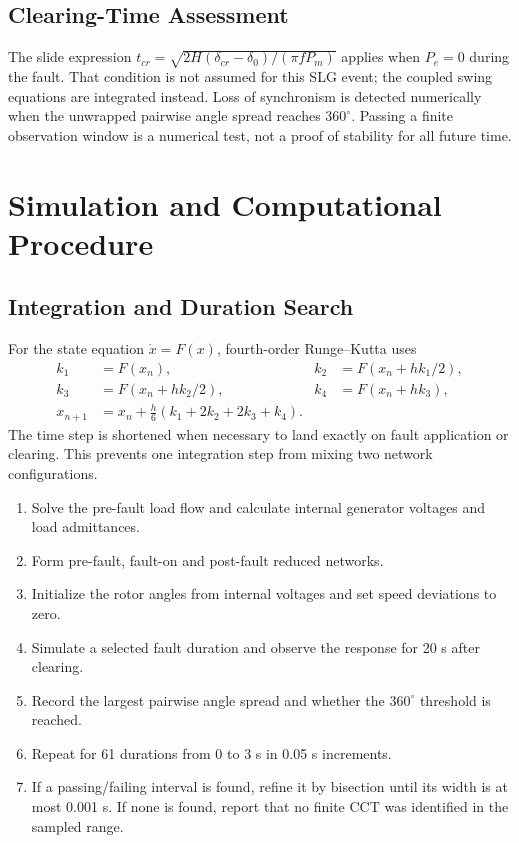 \documentclass[11pt,a4paper]{article}
\begin{document}
\subsection{Clearing-Time Assessment}
The slide expression $t_{cr}=\sqrt{2H(\delta_{cr}-\delta_0)/(\pi fP_m)}$ applies when $P_e=0$ during the fault. That condition is not assumed for this SLG event; the coupled swing equations are integrated instead. Loss of synchronism is detected numerically when the unwrapped pairwise angle spread reaches $360^\circ$. Passing a finite observation window is a numerical test, not a proof of stability for all future time.
\newpage
\section{Simulation and Computational Procedure}
\subsection{Integration and Duration Search}
For the state equation $\dot x=F(x)$, fourth-order Runge--Kutta uses
\begin{align*}
k_1&=F(x_n),&k_2&=F(x_n+hk_1/2),\\
k_3&=F(x_n+hk_2/2),&k_4&=F(x_n+hk_3),\\
x_{n+1}&=x_n+\frac h6(k_1+2k_2+2k_3+k_4).
\end{align*}
The time step is shortened when necessary to land exactly on fault application or clearing. This prevents one integration step from mixing two network configurations.
\begin{enumerate}
\item Solve the pre-fault load flow and calculate internal generator voltages and load admittances.
\item Form pre-fault, fault-on and post-fault reduced networks.
\item Initialize the rotor angles from internal voltages and set speed deviations to zero.
\item Simulate a selected fault duration and observe the response for 20 s after clearing.
\item Record the largest pairwise angle spread and whether the $360^\circ$ threshold is reached.
\item Repeat for 61 durations from 0 to 3 s in 0.05 s increments.
\item If a passing/failing interval is found, refine it by bisection until its width is at most 0.001 s. If none is found, report that no finite CCT was identified in the sampled range.
\end{enumerate}
\end{document}
